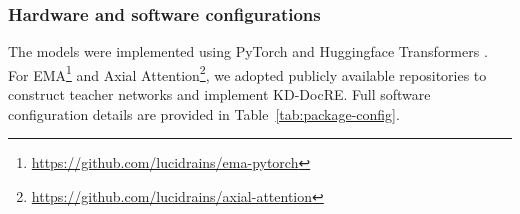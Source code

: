 
\subsubsection{Hardware and software configurations}
\label{sec:hardware-software-config}
The models were implemented using PyTorch \citep{paszke2019pytorch} and Huggingface Transformers \citep{wolf2020transformers}. For EMA\footnote{\href{https://github.com/lucidrains/ema-pytorch}{https://github.com/lucidrains/ema-pytorch}} and Axial Attention\footnote{\href{https://github.com/lucidrains/axial-attention}{https://github.com/lucidrains/axial-attention}}, we adopted publicly available repositories to construct teacher networks and implement KD-DocRE. Full software configuration details are provided in Table~\ref{tab:package-config}.
\begin{table}[!ht]
  \centering
  \caption{Package configurations of our experiments.}
  \label{tab:package-config}
\end{table}

